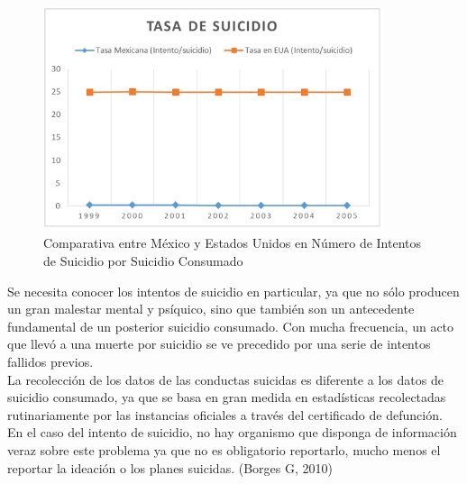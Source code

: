 {{\begin{figure}[hbtp]
\centering
\includegraphics[width=10cm]{imagenes/1-suicidio/tabla2.png}
\caption{Comparativa entre México y Estados Unidos en Número de Intentos de Suicidio por Suicidio Consumado}
\end{figure}


Se necesita conocer los intentos de suicidio en particular, ya que no sólo producen un gran malestar mental y psíquico, sino que también son un antecedente fundamental de un posterior suicidio consumado. Con mucha frecuencia, un acto que llevó a una muerte por suicidio se ve precedido por una serie de intentos fallidos previos.\\

La recolección de los datos de las conductas suicidas es diferente a los datos de suicidio consumado, ya que se basa en gran medida en estadísticas recolectadas rutinariamente por las instancias oficiales a través del certificado de defunción. En el caso del intento de suicidio, no hay organismo que disponga de información veraz sobre este problema ya que no es obligatorio reportarlo, mucho menos el reportar la ideación o los planes suicidas. (Borges G, 2010)\\

}}
